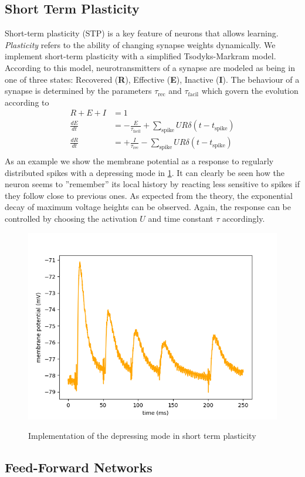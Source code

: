 \documentclass[a4paper,twocolumn]{article}
\begin{document}
\subsection{Short Term Plasticity}
Short-term plasticity (STP) is a key feature of neurons that allows learning.
\textit{Plasticity} refers to the ability of changing synapse weights dynamically.
We implement short-term plasticity with a simplified Tsodyks-Markram model.  According
to this model,  neurotransmitters of a synapse are modeled as being in one of
three states: Recovered (\textbf{R}),  Effective (\textbf{E}),  Inactive
(\textbf{I}).  The behaviour of a synapse is determined by the parameters
$\tau_\text{rec}$ and $\tau_\text{facil}$ which govern the evolution according to
\begin{align*}
	R + E + I &= 1 \\
	\frac{dE}{dt} &= - \frac{E}{\tau_\text{facil}} + \sum_\text{spike} UR\delta(t-t_\text{spike} ) \\
	\frac{dR}{dt} &= + \frac{I}{\tau_\text{rec}} - \sum_\text{spike} UR\delta(t-t_\text{spike} ) \\
\end{align*}
As an example we show the membrane potential as a response to regularly
distributed spikes with a depressing mode in \ref{stp_depress}.  It can clearly be
seen how the neuron seems to ''remember'' its local history by reacting less sensitive
to spikes if they follow close to previous ones.  As expected from the theory,
the exponential decay of maximum voltage heights can be observed.  Again,  the response
can be controlled by choosing the activation $U$ and time constant $\tau$ accordingly.
\begin{figure}
		\includegraphics[width=.5\textwidth]{figures/stp_depressing.png}
		\label{stp_depress}
		\caption{Implementation of the depressing mode in short term plasticity}
\end{figure}

\subsection{Feed-Forward Networks}
\label{sec:feed-forward}
\end{document}
